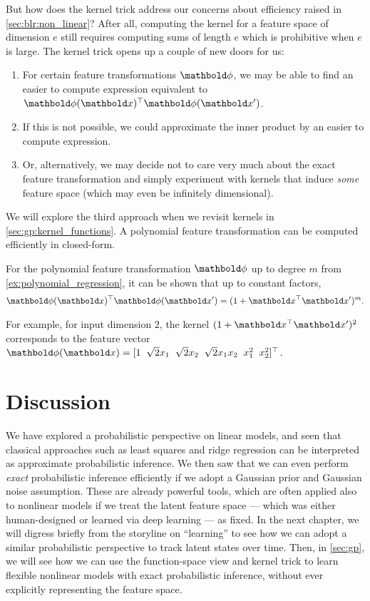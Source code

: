 But how does the kernel trick address our concerns about efficiency raised in \cref{sec:blr:non_linear}?
After all, computing the kernel for a feature space of dimension $e$ still requires computing sums of length $e$ which is prohibitive when $e$ is large.
The kernel trick opens up a couple of new doors for us: \begin{enumerate}
  \item For certain feature transformations $\vphi$, we may be able to find an easier to compute expression equivalent to $\transpose{\vphi(\vx)} \vphi(\vxp)$.
  \item If this is not possible, we could approximate the inner product by an easier to compute expression.
  \item Or, alternatively, we may decide not to care very much about the exact feature transformation and simply experiment with kernels that induce \emph{some} feature space (which may even be infinitely dimensional).
\end{enumerate}
We will explore the third approach when we revisit kernels in \cref{sec:gp:kernel_functions}.
A polynomial feature transformation can be computed efficiently in closed-form.

\begin{fct}
  For the polynomial feature transformation $\vphi$ up to degree $m$ from \cref{ex:polynomial_regression}, it can be shown that up to constant factors, \begin{align}
    \transpose{\vphi(\vx)} \vphi(\vxp) = (1 + \transpose{\vx} \vxp)^m.
  \end{align}
\end{fct}
For example, for input dimension $2$, the kernel $(1 + \transpose{\vx}\vxp)^2$ corresponds to the feature vector $\vphi(\vx) = \transpose{[1 \;\; \sqrt{2} x_1 \;\; \sqrt{2} x_2 \;\; \sqrt{2} x_1 x_2 \;\; x_1^2 \;\; x_2^2]}$.

\section*{Discussion}

We have explored a probabilistic perspective on linear models, and seen that classical approaches such as least squares and ridge regression can be interpreted as approximate probabilistic inference.
We then saw that we can even perform \emph{exact} probabilistic inference efficiently if we adopt a Gaussian prior and Gaussian noise assumption.
These are already powerful tools, which are often applied also to nonlinear models if we treat the latent feature space --- which was either human-designed or learned via deep learning --- as fixed.
In the next chapter, we will digress briefly from the storyline on ``learning'' to see how we can adopt a similar probabilistic perspective to track latent states over time.
Then, in \cref{sec:gp}, we will see how we can use the function-space view and kernel trick to learn flexible nonlinear models with exact probabilistic inference, without ever explicitly representing the feature space.

